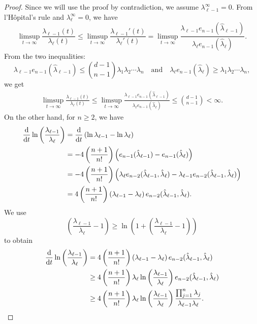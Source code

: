 \documentclass[11pt,reqno]{amsart}
\numberwithin{figure}{section}
\def\d {{\partial}}
\def\d{\mathrm{d}}
\renewcommand{\d}{  {\textup{d}} }
\begin{document}
\begin{proof}
Since we will use the proof by contradiction, we assume $\lambda_{\ell-1}^\infty=0$. From l'H\^{o}pital's rule and $\lambda_{\ell}^\infty=0$, we have 
\[
\limsup_{t\to\infty}\frac{\lambda_{\ell-1}(t)}{\lambda_{\ell}(t)}\leq\limsup_{t\to\infty}\frac{\lambda_{\ell-1}'(t)}{\lambda_{\ell}'(t)}=\limsup_{t\to\infty}\frac{\lambda_{\ell-1}e_{n-1}(\hat{\lambda}_{\ell-1})}{\lambda_{\ell}e_{n-1}(\hat{\lambda}_{\ell})}.
\]
From the two inequalities:
\[
\lambda_{\ell-1}e_{n-1}(\hat{\lambda}_{\ell-1})\leq{d-1\choose n-1} \lambda_1\lambda_2\cdots\lambda_n\quad\text{and}\quad \lambda_{\ell}e_{n-1}(\hat{\lambda}_{\ell})\geq  \lambda_1\lambda_2\cdots\lambda_n,
\]
we get
\begin{align}\label{limsupsup}
\limsup_{t\to\infty}\frac{\lambda_{\ell-1}(t)}{\lambda_{\ell}(t)}\leq\limsup_{t\to\infty}\frac{\lambda_{\ell-1}e_{n-1}(\hat{\lambda}_{\ell-1})}{\lambda_{\ell}e_{n-1}(\hat{\lambda}_{\ell})}\leq {d-1\choose n-1}<\infty.
\end{align}
On the other hand, for $n\geq2$, we have
\begin{align*}
\frac{\d}{\d t}\ln\left(\frac{\lambda_{\ell-1}}{\lambda_{\ell}}\right)&=\frac{\d}{\d t}\left(\ln\lambda_{\ell-1}-\ln\lambda_{\ell}\right)\\
&=-4\left(\frac{n+1}{n!}\right)\left(e_{n-1}(\hat{\lambda}_{\ell-1})-e_{n-1}(\hat{\lambda}_{\ell})\right)\\
&=-4\left(\frac{n+1}{n!}\right)\left(\lambda_{\ell}e_{n-2}(\hat{\lambda}_{\ell-1},\hat{\lambda}_{\ell})-\lambda_{\ell-1}e_{n-2}(\hat{\lambda}_{\ell-1}, \hat{\lambda}_{\ell})\right)\\
&=4\left(\frac{n+1}{n!}\right)\left(\lambda_{\ell-1}-\lambda_{\ell}\right)e_{n-2}(\hat{\lambda}_{\ell-1}, \hat{\lambda}_{\ell}).
\end{align*}
We use 
\[
\left(\frac{\lambda_{\ell-1}}{\lambda_{\ell}}-1 \right)\geq \ln \left(1+\left(\frac{\lambda_{\ell-1}}{\lambda_{\ell}}-1 \right)\right)
\]
to obtain
\begin{align*}
  \frac{\d}{\d t}\ln\left(\frac{\lambda_{\ell-1}}{\lambda_{\ell}}\right)& =4\left(\frac{n+1}{n!}\right)\left(\lambda_{\ell-1}-\lambda_{\ell}\right)e_{n-2}(\hat{\lambda}_{\ell-1}, \hat{\lambda}_{\ell})\\
  &\geq4\left(\frac{n+1}{n!}\right)\lambda_{\ell}\ln\left(\frac{\lambda_{\ell-1}}{\lambda_{\ell}}\right)e_{n-2}(\hat{\lambda}_{\ell-1}, \hat{\lambda}_{\ell})\\
  &\geq4\left(\frac{n+1}{n!}\right)\lambda_{\ell}\ln\left(\frac{\lambda_{\ell-1}}{\lambda_{\ell}}\right)\frac{\prod_{j=1}^{n}\lambda_j}{\lambda_{\ell-1}\lambda_{\ell}}.

\end{align*}
\end{proof}
\end{document}
